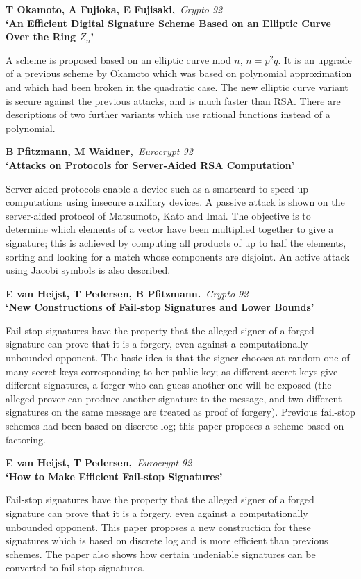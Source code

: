 {\bf \noindent T Okamoto, A Fujioka, E Fujisaki,}{\em ~Crypto 92\\}
{\bf `An Efficient Digital Signature Scheme Based on an Elliptic Curve Over the
Ring $Z_n$'}

A scheme is proposed based on an elliptic curve mod $n$, $n = p^2q$. It is
an upgrade of a previous scheme by Okamoto which was based on polynomial
approximation and which had been broken in the quadratic case. The new
elliptic curve variant is secure against the previous attacks, and is much 
faster than RSA. There are descriptions of two further variants which use 
rational functions instead of a polynomial.

{\bf \noindent B Pfitzmann, M Waidner,}{\em ~Eurocrypt 92\\}
{\bf `Attacks on Protocols for Server-Aided RSA Computation'}

Server-aided protocols enable a device such as a smartcard to speed up
computations using insecure auxiliary devices. A passive attack is shown on 
the server-aided protocol of Matsumoto, Kato and Imai. The objective is to
determine which elements of a vector have been multiplied together to give
a signature; this is achieved by computing all products of up to half the 
elements, sorting and looking for a match whose components are disjoint. 
An active attack using Jacobi symbols is also described.

{\bf \noindent E van Heijst, T Pedersen, B Pfitzmann.}{\em ~Crypto 92\\}
{\bf `New Constructions of Fail-stop Signatures and Lower Bounds'}

Fail-stop signatures have the property that the alleged signer of a forged 
signature can prove that it is a forgery, even against a computationally 
unbounded opponent. The basic idea is that the signer chooses at random one 
of many secret keys corresponding to her public key; as different secret keys 
give different signatures, a forger who can guess another one will be exposed
(the alleged prover can produce another signature to the message, and two 
different signatures on the same message are treated as proof of forgery).
Previous fail-stop schemes had been based on discrete log; this paper 
proposes a scheme based on factoring.

\pagebreak

{\bf \noindent E van Heijst, T Pedersen,}{\em ~Eurocrypt 92\\}
{\bf `How to Make Efficient Fail-stop Signatures'}

Fail-stop signatures have the property that the alleged signer of a forged
signature can prove that it is a forgery, even against a computationally
unbounded opponent. This paper proposes a new construction for these 
signatures which is based on discrete log and is more efficient than
previous schemes. The paper also shows how certain undeniable signatures can be
converted to fail-stop signatures.

